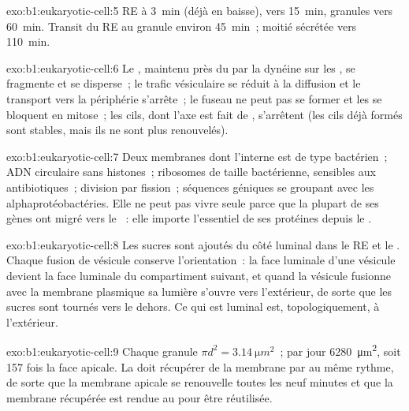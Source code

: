 \begin{solution}{exo:b1:eukaryotic-cell:5}
RE à \qty{3}{min} (déjà en baisse),  vers \qty{15}{min}, granules
vers \qty{60}{min}. Transit du RE au granule environ \qty{45}{min}~;
moitié sécrétée vers \qty{110}{min}.
\end{solution}

\begin{solution}{exo:b1:eukaryotic-cell:6}
Le , maintenu près du  par la dynéine sur les
, se fragmente et se disperse~; le trafic vésiculaire se
réduit à la diffusion et le transport vers la périphérie s'arrête~; le
fuseau ne peut pas se former et les  se bloquent en mitose~; les
cils, dont l'axe est fait de , s'arrêtent (les cils déjà
formés sont stables, mais ils ne sont plus renouvelés).
\end{solution}

\begin{solution}{exo:b1:eukaryotic-cell:7}
Deux membranes dont l'interne est de type bactérien~; ADN circulaire
sans histones~; ribosomes de taille bactérienne, sensibles aux
antibiotiques~; division par fission~; séquences géniques se groupant
avec les alphaprotéobactéries. Elle ne peut pas vivre seule parce que
la plupart de ses gènes ont migré vers le ~: elle importe
l'essentiel de ses protéines depuis le .
\end{solution}

\begin{solution}{exo:b1:eukaryotic-cell:8}
Les sucres sont ajoutés du côté luminal dans le RE et le . Chaque
fusion de vésicule conserve l'orientation~: la face luminale d'une
vésicule devient la face luminale du compartiment suivant, et quand la
vésicule fusionne avec la membrane plasmique sa lumière s'ouvre vers
l'extérieur, de sorte que les sucres sont tournés vers le dehors. Ce
qui est luminal est, topologiquement, à l'extérieur.
\end{solution}

\begin{solution}{exo:b1:eukaryotic-cell:9}
Chaque granule $\pi d^2 = \qty{3.14}{\micro m^2}$~; par jour
\qty{6280}{\micro m^2}, soit \qty{157}{} fois la face apicale. La
 doit récupérer de la membrane par  au même rythme, de
sorte que la membrane apicale se renouvelle toutes les neuf minutes et
que la membrane récupérée est rendue au  pour être réutilisée.
\end{solution}

